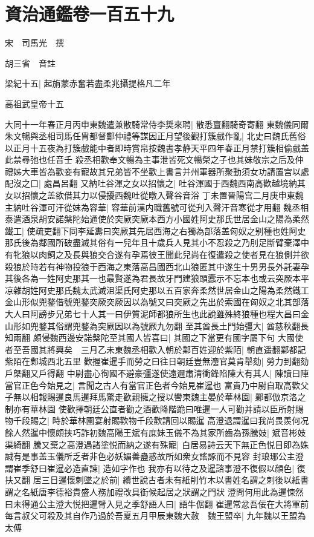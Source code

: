 \chapter{資治通鑑卷一百五十九}
宋　司馬光　撰

胡三省　音註

梁紀十五|{
	起旃蒙赤奮若盡柔兆攝提格凡二年}


高祖武皇帝十五

大同十一年春正月丙申東魏遣兼散騎常侍李奨來聘|{
	散悉亶翻騎奇寄翻}
東魏儀同爾朱文暢與丞相司馬任胄都督鄭仲禮等謀因正月望後觀打簇戲作亂|{
	北史曰魏氏舊俗以正月十五夜為打簇戲能中者即時賞帛按魏書孝静天平四年春正月禁打簇相偷戲盖此禁尋弛也任音壬}
殺丞相歡奉文暢為主事泄皆死文暢榮之子也其妹敬宗之后及仲禮姊大車皆為歡妾有寵故其兄弟皆不坐歡上書言并州軍器所聚動須女功請置宫以處配沒之口|{
	處昌呂翻}
又納吐谷渾之女以招懷之|{
	吐谷渾國于西魏西南高歡越境納其女以招懷之盖欲借其力以侵擾西魏吐從暾入聲谷音浴}
丁未置晉陽宫二月庚申東魏主納吐谷渾可汗從妹為容華|{
	容華前漢内職舊號可從刋入聲汗音寒從才用翻}
魏丞相泰遣酒泉胡安諾槃陀始通使於突厥突厥本西方小國姓阿史那氏世居金山之陽為柔然鐵工|{
	使疏吏翻下同李延夀曰突厥其先居西海之右獨為部落盖匈奴之别種也姓阿史那氏後為鄰國所破盡滅其俗有一兒年且十歲兵人見其小不忍殺之乃刖足斷臂棄澤中有牝狼以肉飼之及長與狼交合遂有孕焉彼王聞此兒尚在復遣殺之使者見在狼側并欲殺狼於時若有神物投狼于西海之東落高昌國西北山狼匿其中遂生十男男長外託妻孕其後各為一姓阿史那其一也最賢遂為君長故牙門建狼頭蠧示不忘本也或云突厥本平凉雜胡姓阿史那氏魏太武滅沮渠氏阿史那以五百家奔柔然世居金山之陽為柔然鐵工金山形似兜鍪借號兜鍪突厥突厥因以為號又曰突厥之先出於索國在匈奴之北其部落大人曰阿謗步兄弟七十人其一曰伊質泥師都狼所生也此說雖殊終狼種也程大昌曰金山形如兜鍪其俗謂兜鍪為突厥因以為號厥九勿翻}
至其酋長土門始彊大|{
	酋慈秋翻長知兩翻}
頗侵魏西邊安諾槃陀至其國人皆喜曰|{
	其國之下當更有國字屬下句}
大國使者至吾國其將興矣　三月乙未東魏丞相歡入朝於鄴百姓迎於紫陌|{
	朝直遥翻鄴都記紫陌在鄴城西北五里}
歡握崔暹手而勞之曰往日朝廷豈無灋官莫肯舉劾|{
	勞力到翻劾戶槩翻又戶得翻}
中尉盡心徇國不避豪彊遂使遠邇肅清衝鋒陷陳大有其人|{
	陳讀曰陣}
當官正色今始見之|{
	言聞之古人有當官正色者今始見崔暹也}
富貴乃中尉自取高歡父子無以相報賜暹良馬暹拜馬驚走歡親擁之授以轡東魏主晏於華林園|{
	鄴都倣京洛之制亦有華林園}
使歡擇朝廷公直者勸之酒歡降階跪曰唯暹一人可勸并請以臣所射賜物千段賜之|{
	時於華林園宴射賜歡物千段歡請回以賜暹}
高澄退謂暹曰我尚畏羨何况餘人然暹中懷頗挟巧詐初魏高陽王斌有庶妹玉儀不為其家所齒為孫騰妓|{
	斌音彬妓渠綺翻}
騰又棄之高澄遇諸塗悦而納之遂有殊寵|{
	白居易詩云天下無正色悦目即為姝誠有是事盖玉儀所乏者非色必妖媚善蠱惑故所如衆女謠諑而不見容}
封琅琊公主澄謂崔季舒曰崔暹必造直諫|{
	造如字作也}
我亦有以待之及暹諮事澄不復假以顔色|{
	復扶又翻}
居三日暹懷刺墜之於前|{
	續世說古者未有紙削竹木以書姓名謂之刺後以紙書謂之名紙唐李德裕貴盛人務加禮改具衘候起居之狀謂之門狀}
澄問何用此為暹悚然曰未得通公主澄大悦把暹臂入見之季舒語人曰|{
	語牛倨翻}
崔暹常忿吾佞在大將軍前每言叔父可殺及其自作乃過於吾夏五月甲辰東魏大赦　魏王盟卒|{
	九年魏以王盟為太傅}


